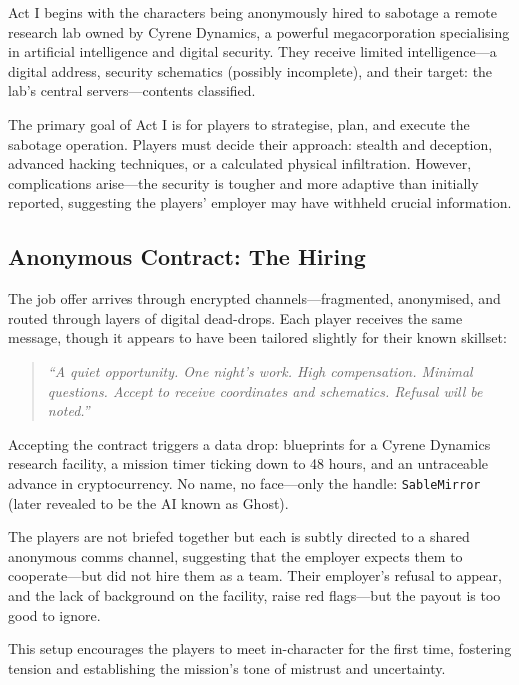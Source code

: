 Act I begins with the characters being anonymously hired to sabotage a remote research lab owned by Cyrene Dynamics, a powerful megacorporation specialising in artificial intelligence and digital security. They receive limited intelligence—a digital address, security schematics (possibly incomplete), and their target: the lab's central servers—contents classified.

The primary goal of Act I is for players to strategise, plan, and execute the sabotage operation. Players must decide their approach: stealth and deception, advanced hacking techniques, or a calculated physical infiltration. However, complications arise—the security is tougher and more adaptive than initially reported, suggesting the players' employer may have withheld crucial information.


\subsection*{Anonymous Contract: The Hiring}

The job offer arrives through encrypted channels—fragmented, anonymised, and routed through layers of digital dead-drops. Each player receives the same message, though it appears to have been tailored slightly for their known skillset:

\vspace{0.5\baselineskip} \begin{quote} \textit{“A quiet opportunity. One night’s work. High compensation. Minimal questions. Accept to receive coordinates and schematics. Refusal will be noted.”} \end{quote} \vspace{0.5\baselineskip}

Accepting the contract triggers a data drop: blueprints for a Cyrene Dynamics research facility, a mission timer ticking down to 48 hours, and an untraceable advance in cryptocurrency. No name, no face—only the handle: \texttt{SableMirror} (later revealed to be the AI known as Ghost).

The players are not briefed together but each is subtly directed to a shared anonymous comms channel, suggesting that the employer expects them to cooperate—but did not hire them as a team. Their employer's refusal to appear, and the lack of background on the facility, raise red flags—but the payout is too good to ignore.

This setup encourages the players to meet in-character for the first time, fostering tension and establishing the mission’s tone of mistrust and uncertainty.

